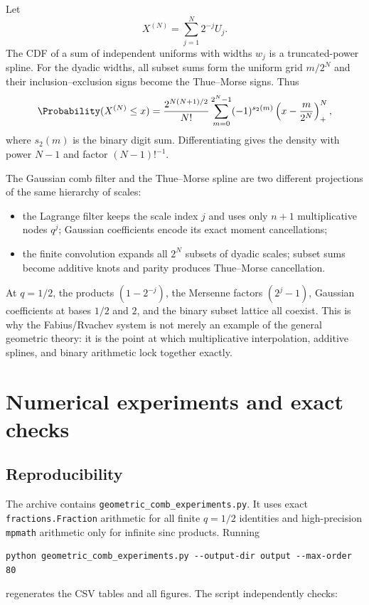 \documentclass[11pt,a4paper,oneside]{article}
\theoremstyle{definition}
\theoremstyle{remark}
\begin{document}
Let
\begin{equation}
 X^{(N)}=\sum_{j=1}^N2^{-j}U_j.
 \label{eq:finite-dyadic-sum}
\end{equation}
The CDF of a sum of independent uniforms with widths $w_j$ is a truncated-power
spline.  For the dyadic widths, all subset sums form the uniform grid
$m/2^N$ and their inclusion--exclusion signs become the Thue--Morse signs.
Thus
\begin{equation}
 \Probability(X^{(N)}\le x)
 =\frac{2^{N(N+1)/2}}{N!}
 \sum_{m=0}^{2^N-1}(-1)^{s_2(m)}
 \left(x-\frac{m}{2^N}\right)_+^N,
 \label{eq:thue-morse-spline-cdf}
\end{equation}
where $s_2(m)$ is the binary digit sum.  Differentiating gives the density with
power $N-1$ and factor $(N-1)!^{-1}$.

The Gaussian comb filter and the Thue--Morse spline are two different
projections of the same hierarchy of scales:

\begin{itemize}
\item the Lagrange filter keeps the scale index $j$ and uses only $n+1$
      multiplicative nodes $q^j$; Gaussian coefficients encode its exact
      moment cancellations;
\item the finite convolution expands all $2^N$ subsets of dyadic scales;
      subset sums become additive knots and parity produces Thue--Morse
      cancellation.
\end{itemize}

At $q=1/2$, the products $(1-2^{-j})$, the Mersenne factors $(2^j-1)$,
Gaussian coefficients at bases $1/2$ and $2$, and the binary subset lattice
all coexist.  This is why the Fabius/Rvachev system is not merely an example of
the general geometric theory: it is the point at which multiplicative
interpolation, additive splines, and binary arithmetic lock together exactly.

\section{Numerical experiments and exact checks}
\label{sec:numerics}

\subsection{Reproducibility}

The archive contains \texttt{geometric\_comb\_experiments.py}.  It uses exact
\texttt{fractions.Fraction} arithmetic for all finite $q=1/2$ identities and
high-precision \texttt{mpmath} arithmetic only for infinite sinc products.
Running
\begin{lstlisting}[style=pythonstyle]
python geometric_comb_experiments.py --output-dir output --max-order 80
\end{lstlisting}
regenerates the CSV tables and all figures.  The script independently checks:
\end{document}
